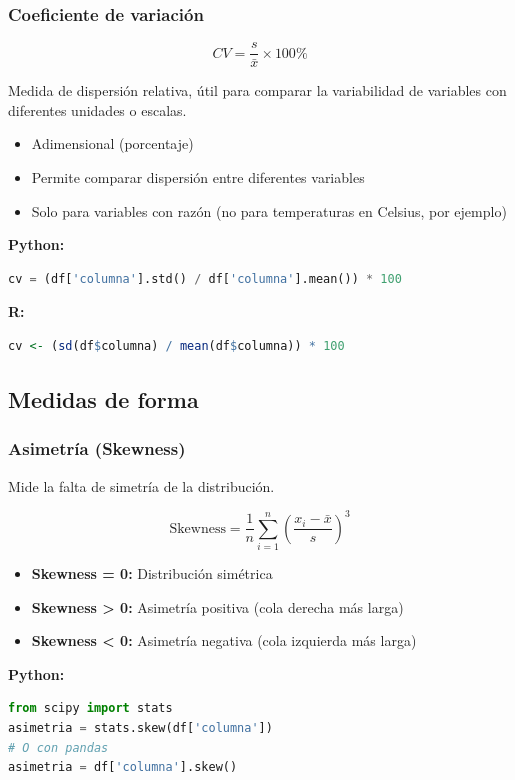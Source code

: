 \documentclass[a4paper,11pt]{article}
\begin{document}
\subsubsection{Coeficiente de variación}

$$CV = \frac{s}{\bar{x}} \times 100\%$$

Medida de dispersión relativa, útil para comparar la variabilidad de variables con diferentes unidades o escalas.

\begin{itemize}
    \item Adimensional (porcentaje)
    \item Permite comparar dispersión entre diferentes variables
    \item Solo para variables con razón (no para temperaturas en Celsius, por ejemplo)
\end{itemize}

\textbf{Python:}
\begin{lstlisting}[language=Python]
cv = (df['columna'].std() / df['columna'].mean()) * 100
\end{lstlisting}

\textbf{R:}
\begin{lstlisting}[language=R]
cv <- (sd(df$columna) / mean(df$columna)) * 100
\end{lstlisting}

\subsection{Medidas de forma}

\subsubsection{Asimetría (Skewness)}

Mide la falta de simetría de la distribución.

$$\text{Skewness} = \frac{1}{n}\sum_{i=1}^{n}\left(\frac{x_i - \bar{x}}{s}\right)^3$$

\begin{itemize}
    \item \textbf{Skewness = 0:} Distribución simétrica
    \item \textbf{Skewness > 0:} Asimetría positiva (cola derecha más larga)
    \item \textbf{Skewness < 0:} Asimetría negativa (cola izquierda más larga)
\end{itemize}

\textbf{Python:}
\begin{lstlisting}[language=Python]
from scipy import stats
asimetria = stats.skew(df['columna'])
# O con pandas
asimetria = df['columna'].skew()
\end{lstlisting}
\end{document}
